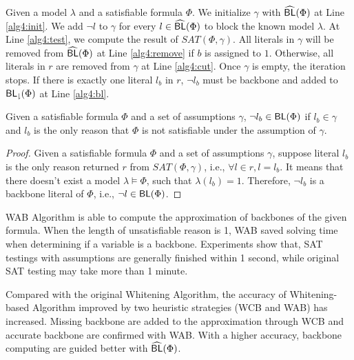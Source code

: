 Given a model $\lambda$ and a satisfiable formula $\Phi$. We initialize $\gamma$ with ${\sf \widehat{BL}}(\Phi)$ at Line \ref{alg4:init}. We add $\neg l$ to $\gamma$ for every $l\in{\sf \widehat{BL}}(\Phi)$ to block the known model $\lambda$. At Line \ref{alg4:test}, we compute the result of $SAT(\Phi,\gamma)$. All literals in $\gamma$ will be removed from ${\sf \widehat{BL}}(\Phi)$ at Line \ref{alg4:remove} if $b$ is assigned to $1$. Otherwise, all literals in $r$ are removed from $\gamma$ at Line \ref{alg4:cut}. Once $\gamma$ is empty, the iteration stops. If there is exactly one literal $l_b$ in $r$, $\neg l_b$ must be backbone and added to ${\sf {BL}_\downharpoonright}(\Phi)$ at Line \ref{alg4:bl}.

\begin{theorem}
Given a satisfiable formula $\Phi$ and a set of assumptions $\gamma$, $\neg l_b\in\textsf{BL}(\Phi)$ if $l_b\in\gamma$ and $l_b$ is the only reason that $\Phi$ is not satisfiable under the assumption of $\gamma$.
\end{theorem}

\begin{proof}
Given a satisfiable formula $\Phi$ and a set of assumptions $\gamma$, suppose literal $l_b$ is the only reason returned $r$ from $SAT(\Phi,\gamma)$, i.e., $\forall l\in r, l=l_b$.
It means that there doesn't exist a model $\lambda\models\Phi$, such that $\lambda(l_b)=1$. Therefore, $\neg l_b$ is a backbone literal of $\Phi$, i.e., $\neg l\in\textsf{BL}(\Phi)$.
\end{proof}

WAB Algorithm is able to compute the approximation of backbones of the given formula. When the length of unsatisfiable reason is 1, WAB saved solving time when determining if a variable is a backbone. Experiments show that, SAT testings with assumptions are generally finished within 1 second, while original SAT testing may take more than 1 minute. 

Compared with the original Whitening Algorithm, the accuracy of Whitening-based Algorithm improved by two heuristic strategies (WCB and WAB) has increased. Missing backbone are added to the approximation through WCB and accurate backbone are confirmed with WAB. With a higher accuracy, backbone computing are guided better with ${\sf \widehat{BL}}(\Phi)$.
